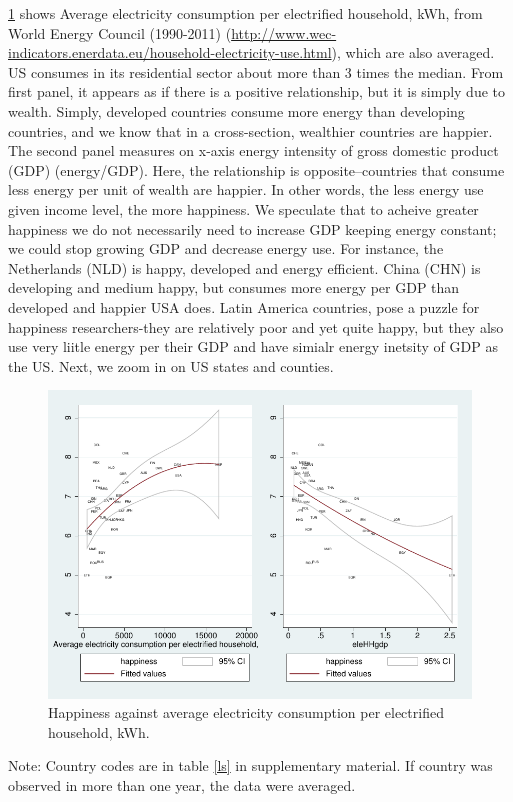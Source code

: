 \documentclass[10pt, letterpaper]{article}
\begin{document}
\begin{spacing}{1.4}
\ref{couWvsLsEleHHgdp} shows Average electricity consumption per electrified household, kWh, from World
Energy Council (1990-2011) (\url{http://www.wec-indicators.enerdata.eu/household-electricity-use.html}), which are also averaged. 
   US consumes
in its residential sector about more than 3 times the median.%
From first panel, it appears
 as if there is a positive relationship, but it is simply due to wealth. Simply,
 developed countries consume more energy than developing countries, and we know
 that in a cross-section, wealthier countries are happier. The second panel
 measures on x-axis energy intensity of gross domestic product (GDP)
 (energy/GDP). Here, the relationship is opposite--countries that  consume less
 energy per unit of wealth are happier. In other words, the less energy use
 given income level, the more happiness. We speculate that to acheive greater happiness we
 do not necessarily need to increase GDP keeping energy constant; we could stop
 growing GDP and decrease energy use. For instance, the Netherlands (NLD) is
 happy, developed and energy efficient. China (CHN) is developing and medium
 happy, but consumes more energy per GDP than developed and happier USA does.  
Latin America countries, pose a puzzle for happiness researchers-they are
relatively poor and yet quite happy, but they also  use very liitle  energy per
their GDP and have simialr energy inetsity of GDP as the US. Next, we zoom in on
US states and counties.

\begin{figure}[H]
 \includegraphics[width=6in]{graphsAndTables/couWvsLsEleHHgdp.pdf}\centering
 \caption{Happiness against average electricity consumption per electrified
   household, kWh.}\label{couWvsLsEleHHgdp}
\end{figure}
{\scriptsize Note: Country codes are in table \ref{ls} in supplementary
  material. If country was observed in more than one year, the data were averaged.}




\end{spacing}
\end{document}
